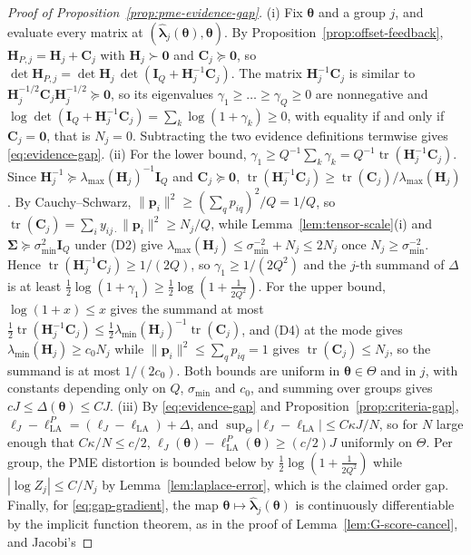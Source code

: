 \begin{proof}[Proof of Proposition~\ref{prop:pme-evidence-gap}]
(i) Fix $\bm{\theta}$ and a group $j$, and evaluate every matrix at $(\hat{\bm{\lambda}}_{j}(\bm{\theta}),\bm{\theta})$. By Proposition~\ref{prop:offset-feedback}, $\mathbf{H}_{P,j}=\mathbf{H}_{j}+\mathbf{C}_{j}$ with $\mathbf{H}_{j}\succ\bm{0}$ and $\mathbf{C}_{j}\succeq\bm{0}$, so $\det\mathbf{H}_{P,j}=\det\mathbf{H}_{j}\,\det(\mathbf{I}_{Q}+\mathbf{H}_{j}^{-1}\mathbf{C}_{j})$. The matrix $\mathbf{H}_{j}^{-1}\mathbf{C}_{j}$ is similar to $\mathbf{H}_{j}^{-1/2}\mathbf{C}_{j}\mathbf{H}_{j}^{-1/2}\succeq\bm{0}$, so its eigenvalues $\gamma_{1}\geq\dots\geq\gamma_{Q}\geq0$ are nonnegative and $\log\det(\mathbf{I}_{Q}+\mathbf{H}_{j}^{-1}\mathbf{C}_{j})=\sum_{k}\log(1+\gamma_{k})\geq0$, with equality if and only if $\mathbf{C}_{j}=\bm{0}$, that is $N_{j}=0$. Subtracting the two evidence definitions termwise gives \eqref{eq:evidence-gap}. (ii) For the lower bound, $\gamma_{1}\geq Q^{-1}\sum_{k}\gamma_{k}=Q^{-1}\operatorname{tr}(\mathbf{H}_{j}^{-1}\mathbf{C}_{j})$. Since $\mathbf{H}_{j}^{-1}\succeq\lambda_{\max}(\mathbf{H}_{j})^{-1}\mathbf{I}_{Q}$ and $\mathbf{C}_{j}\succeq\bm{0}$, $\operatorname{tr}(\mathbf{H}_{j}^{-1}\mathbf{C}_{j})\geq\operatorname{tr}(\mathbf{C}_{j})/\lambda_{\max}(\mathbf{H}_{j})$. By Cauchy--Schwarz, $\|\bm{p}_{i}\|^{2}\geq(\sum_{q}p_{iq})^{2}/Q=1/Q$, so $\operatorname{tr}(\mathbf{C}_{j})=\sum_{i}y_{ij\cdot}\|\bm{p}_{i}\|^{2}\geq N_{j}/Q$, while Lemma~\ref{lem:tensor-scale}(i) and $\bm{\Sigma}\succeq\sigma^{2}_{\min}\mathbf{I}_{Q}$ under (D2) give $\lambda_{\max}(\mathbf{H}_{j})\leq\sigma_{\min}^{-2}+N_{j}\leq2N_{j}$ once $N_{j}\geq\sigma_{\min}^{-2}$. Hence $\operatorname{tr}(\mathbf{H}_{j}^{-1}\mathbf{C}_{j})\geq1/(2Q)$, so $\gamma_{1}\geq1/(2Q^{2})$ and the $j$-th summand of $\Delta$ is at least $\frac{1}{2}\log(1+\gamma_{1})\geq\frac{1}{2}\log(1+\frac{1}{2Q^{2}})$. For the upper bound, $\log(1+x)\leq x$ gives the summand at most $\frac{1}{2}\operatorname{tr}(\mathbf{H}_{j}^{-1}\mathbf{C}_{j})\leq\frac{1}{2}\lambda_{\min}(\mathbf{H}_{j})^{-1}\operatorname{tr}(\mathbf{C}_{j})$, and (D4) at the mode gives $\lambda_{\min}(\mathbf{H}_{j})\geq c_{0}N_{j}$ while $\|\bm{p}_{i}\|^{2}\leq\sum_{q}p_{iq}=1$ gives $\operatorname{tr}(\mathbf{C}_{j})\leq N_{j}$, so the summand is at most $1/(2c_{0})$. Both bounds are uniform in $\bm{\theta}\in\Theta$ and in $j$, with constants depending only on $Q$, $\sigma_{\min}$ and $c_{0}$, and summing over groups gives $cJ\leq\Delta(\bm{\theta})\leq CJ$. (iii) By \eqref{eq:evidence-gap} and Proposition~\ref{prop:criteria-gap}, $\ell_{J}-\ell_{\text{LA}}^{P}=(\ell_{J}-\ell_{\text{LA}})+\Delta$, and $\sup_{\Theta}|\ell_{J}-\ell_{\text{LA}}|\leq C\kappa J/N$, so for $N$ large enough that $C\kappa/N\leq c/2$, $\ell_{J}(\bm{\theta})-\ell_{\text{LA}}^{P}(\bm{\theta})\geq(c/2)J$ uniformly on $\Theta$. Per group, the PME distortion is bounded below by $\frac{1}{2}\log(1+\frac{1}{2Q^{2}})$ while $|\log Z_{j}|\leq C/N_{j}$ by Lemma~\ref{lem:laplace-error}, which is the claimed order gap. Finally, for \eqref{eq:gap-gradient}, the map $\bm{\theta}\mapsto\hat{\bm{\lambda}}_{j}(\bm{\theta})$ is continuously differentiable by the implicit function theorem, as in the proof of Lemma~\ref{lem:G-score-cancel}, and Jacobi's 
\end{proof}
